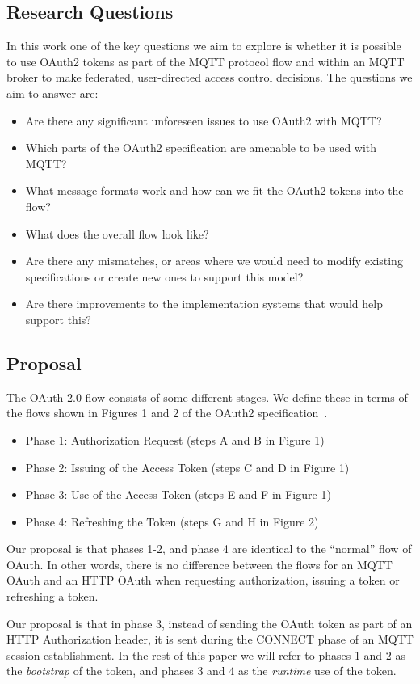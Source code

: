 \documentclass{IEEEtran}
\begin{document}
\subsection{Research Questions}
In this work one of the key questions we aim to explore is whether it is possible to use 
OAuth2 tokens as part of the 
MQTT protocol flow and within an MQTT broker to make federated, user-directed access control 
decisions. The questions we aim to answer are:
\begin{itemize}
\item Are there any significant unforeseen issues to use OAuth2 with MQTT? 
\item Which parts of the OAuth2 specification are amenable to be used with MQTT?
\item What message formats work and how can we fit the OAuth2 tokens into the flow?
\item What does the overall flow look like?
\item Are there any mismatches, or areas where we would need to modify existing specifications or 
create new ones to support this model?
\item Are there improvements to the implementation systems that would help support this?
\end{itemize}

\subsection{Proposal}
The OAuth 2.0 flow consists of some different stages. We define these in terms of the 
flows shown in Figures 1 and 2 of the  OAuth2 specification~\cite{rfc6749}.
\begin{itemize}
\item Phase 1: Authorization Request (steps A and B in Figure 1)
\item Phase 2: Issuing of the Access Token (steps C and D in Figure 1)
\item Phase 3: Use of the Access Token (steps E and F in Figure 1)
\item Phase 4: Refreshing the Token (steps G and H in Figure 2)
\end{itemize}

Our proposal is that phases 1-2, and phase 4 are identical to the ``normal'' flow of OAuth. 
In other words, there is no difference between the flows for an MQTT OAuth and an HTTP OAuth 
when requesting authorization, issuing a token or 
refreshing a token.

Our proposal is that in phase 3, instead of sending the OAuth token as part of an HTTP 
Authorization header, it is sent during the CONNECT phase of an MQTT session establishment. 
In the rest of this paper we will refer to phases 1 and 2 as the \emph{bootstrap} of the token, and
phases 3 and 4 as the \emph{runtime} use of the token.
\end{document}
